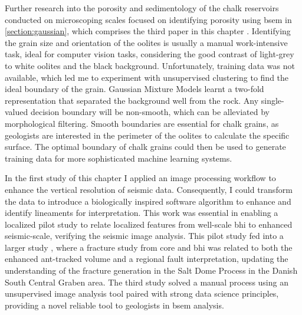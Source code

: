 Further research into the porosity and sedimentology of the chalk reservoirs conducted on microscoping scales focused on identifying porosity using \acf{bsem} in \cref{section:gaussian}, which comprises the third paper in this chapter \citep{dramsch2018gaussian}. Identifying the grain size and orientation of the oolites is usually a manual work-intensive task, ideal for computer vision tasks, considering the good contrast of light-grey to white oolites and the black background. Unfortunately, training data was not available, which led me to experiment with unsupervised clustering to find the ideal boundary of the grain. Gaussian Mixture Models learnt a two-fold representation that separated the background well from the rock. Any single-valued decision boundary will be non-smooth, which can be alleviated by morphological filtering. Smooth boundaries are essential for chalk grains, as geologists are interested in the perimeter of the oolites to calculate the specific surface. The optimal boundary of chalk grains could then be used to generate training data for more sophisticated machine learning systems.


In the first study of this chapter \citep{aabo2017correlation} I applied an image processing workflow to enhance the vertical resolution of seismic data. Consequently, I could transform the data to introduce a biologically inspired software algorithm to enhance and identify lineaments for interpretation. This work was essential in enabling a localized pilot study to relate localized features from well-scale \ac{bhi} to enhanced seismic-scale, verifying the seismic image analysis. This pilot study fed into a larger study \citep{aabo2018integrated}, where a fracture study from core and \ac{bhi} was related to both the enhanced ant-tracked volume and a regional fault interpretation, updating the understanding of the fracture generation in the Salt Dome Process in the Danish South Central Graben area. The third study solved a manual process using an unsupervised image analysis tool paired with strong data science principles, providing a novel reliable tool to geologists in \ac{bsem} analysis.